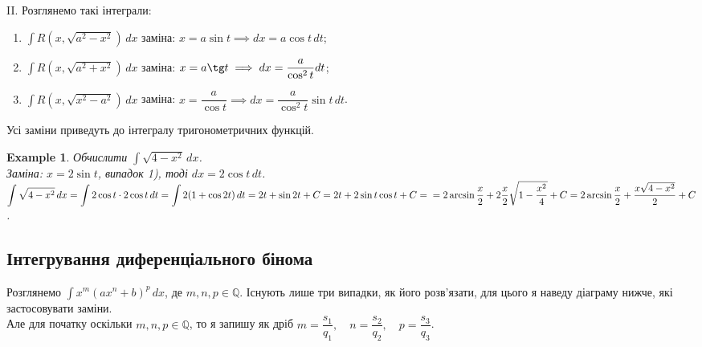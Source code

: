\documentclass[a4paper, 10pt]{article}
\def\huge{\displaystyle}
\theoremstyle{theoremdd}
\theoremstyle{theoremdd}
\theoremstyle{theoremdd}
\theoremstyle{theoremdd}
\theoremstyle{theoremdd}
\newtheorem{example}[theorem]{Example}
\theoremstyle{theoremdd}
\theoremstyle{theoremdd}
\theoremstyle{theoremdd}
\theoremstyle{theoremdd}
\begin{document}
II. Розглянемо такі інтеграли:
\begin{enumerate}[nosep, wide=0pt, label={\arabic*)}]
\item $\huge \int R\left(x,\sqrt{a^2-x^2}\right)\,dx$ \qquad заміна: $x = a\sin t \implies dx = a\cos t \,dt$;
\item $\huge \int R\left(x,\sqrt{a^2+x^2}\right)\,dx$ \qquad заміна: $x = a\tg t \implies dx = \dfrac{a}{\cos^2 t} dt$;

\item $\huge \int R\left(x, \sqrt{x^2-a^2}\right)\,dx$ \qquad заміна: $x = \dfrac{a}{\cos t} \implies dx = \dfrac{a}{\cos^2 t} \sin t\,dt$.

\end{enumerate}
Усі заміни приведуть до інтегралу тригонометричних функцій.

\begin{example}
Обчислити $\huge \int \sqrt{4-x^2}\,dx$.\\
Заміна: $x = 2\sin t$, випадок 1), тоді $dx = 2 \cos t \,dt$.\\
$\huge \int \sqrt{4-x^2}\,dx = \int 2 \cos t \cdot 2 \cos t \,dt = \int 2(1+\cos 2t)\,dt = 2t + \sin 2t + C = 2t + 2 \sin t \cos t + C = \\ = 2 \arcsin \frac{x}{2} + 2 \frac{x}{2} \sqrt{1-\frac{x^2}{4}}+C = 2 \arcsin \frac{x}{2} + \dfrac{x \sqrt{4-x^2}}{2} + C$.
\end{example}

\subsection{Інтегрування диференціального бінома}
Розглянемо $\huge \int x^m (ax^n + b)^p\,dx$, \qquad де $m,n,p \in \mathbb{Q}$. Існують лише три випадки, як його розв'язати, для цього я наведу діаграму нижче, які застосовувати заміни.\\
Але для початку оскільки $m,n,p \in \mathbb{Q}$, то я запишу як дріб $m= \dfrac{s_1}{q_1}, \quad n = \dfrac{s_2}{q_2},\quad p = \dfrac{s_3}{q_3}$.\\
\\
\end{document}
